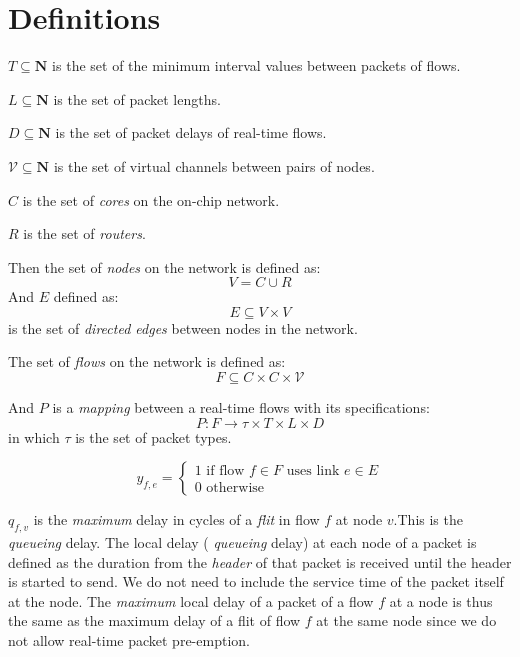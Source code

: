 \documentclass[conference, twocolumn]{IEEEtran}
\theoremstyle{definition}
\begin{document}
\section{Definitions}
$T \subseteq \mathbf{N}$ is the set of the minimum interval values between
packets of flows.

$L \subseteq \mathbf{N}$ is the set of packet lengths.

$D \subseteq \mathbf{N}$ is the set of packet delays of real-time flows.

$\mathcal{V} \subseteq \mathbf{N}$ is the set of virtual channels between pairs of nodes.

$C$ is the set of {\em cores} on the on-chip network.

$R$ is the set of {\em routers}.

Then the set of {\em nodes} on the network is defined as:
\begin{equation}\label{reio}
V = C \cup R
\end{equation}
And $E$ defined as:
\begin{equation}
E \subseteq V \times V 
\end{equation}
is the set of {\em directed edges} between nodes in the network.

The set of {\em flows} on the network is defined as:
\begin{equation}
F \subseteq C \times C \times \mathcal{V} 
\end{equation}

And $P$ is a {\em mapping } between a real-time flows with its specifications:
\begin{equation}
P:F \rightarrow \tau \times T \times L \times D
\end{equation}
in which $\tau$ is the set of packet types.

\begin{equation}
y_{f,e} = \left\{ \begin{array}{lrc}
1 \mbox{ if flow } f \in F \mbox{ uses link } e \in E \\
0 \mbox{ otherwise} 
\end{array}\right.
\end{equation}

$q_{f,v}$ is the {\em maximum} delay in cycles of a {\em flit} in
flow $f$ at node $v$.This is the {\em queueing} delay. The local delay ({\em
queueing} delay) at each node of a packet is defined as the duration from the
{\em header} of that  packet is received until the header is started to send.
We do not need to include the service time of the packet itself at the node.
The {\em maximum} local delay of a packet of a flow $f$ at a node is thus the
same as the maximum delay of a flit of flow $f$ at the same node since we do
not allow real-time packet pre-emption. %
\end{document}
